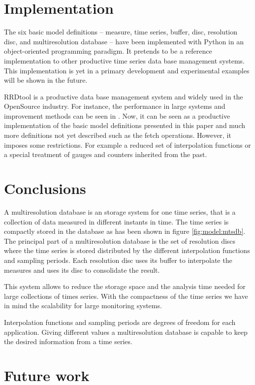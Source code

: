\section{Implementation}

The six basic model definitions -- measure, time series, buffer, disc,
resolution disc, and multiresolution database -- have been implemented
with Python in an object-oriented programming paradigm. It pretends to
be a reference implementation to other productive time series data
base management systems. This implementation is yet in a primary
development and experimental examples will be shown in the future.

RRDtool \parencite{rrdtool} is a productive data base
management system and widely used in the OpenSource industry. For
instance, the performance in large systems and improvement methods can
be seen in \cite{lisa07:plonka}. Now, it can be seen as a
productive implementation of the basic model definitions presented in
this paper and much more definitions not yet described such as the
fetch operations. However, it imposes some restrictions. For example a
reduced set of interpolation functions or a special treatment of
gauges and counters inherited from the past.

\section{Conclusions}

A multiresolution database is an storage system for one time series, that
is a collection of data measured in different instants in time.  The
time series is compactly stored in the database as has been shown in
figure \ref{fig:model:mtsdb}. The principal part of a multiresolution
database is the set of resolution discs where the time series is
stored distributed by the different interpolation functions and
sampling periods. Each resolution disc uses its buffer to interpolate
the measures and uses its disc to consolidate the result. 

This system allows to reduce the storage space and the analysis time
needed for large collections of times series.  With the compactness of
the time series we have in mind the scalability for large monitoring
systems.

Interpolation functions and sampling periods are degrees
of freedom for each application. Giving different values a multiresolution
database is capable to keep the desired information from a time series.


\section{Future work}

